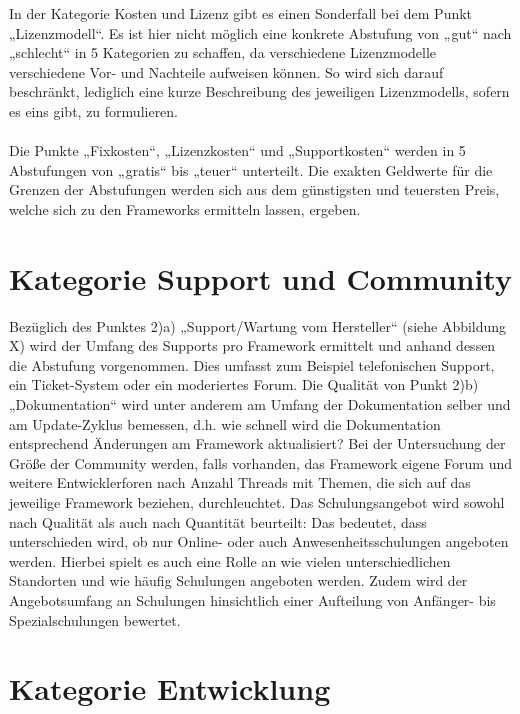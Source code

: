 In der Kategorie Kosten und Lizenz gibt es einen Sonderfall bei dem Punkt „Lizenzmodell“. Es ist hier nicht möglich eine konkrete Abstufung von „gut“ nach „schlecht“ in 5 Kategorien zu schaffen, da verschiedene Lizenzmodelle verschiedene Vor- und Nachteile aufweisen können. So wird sich darauf beschränkt, lediglich eine kurze Beschreibung des jeweiligen Lizenzmodells, sofern es eins gibt, zu formulieren. 
\\
\\
Die Punkte „Fixkosten“, „Lizenzkosten“ und „Supportkosten“ werden in 5 Abstufungen von „gratis“ bis „teuer“ unterteilt. Die exakten Geldwerte für die Grenzen der Abstufungen werden sich aus dem günstigsten und teuersten Preis, welche sich zu den Frameworks ermitteln lassen, ergeben.

\section{Kategorie Support und Community}

Bezüglich des Punktes 2)a) „Support/Wartung vom Hersteller“ (siehe Abbildung X) wird der Umfang des Supports pro Framework ermittelt und anhand dessen die Abstufung vorgenommen. Dies umfasst zum Beispiel telefonischen Support, ein Ticket-System oder ein moderiertes Forum. Die Qualität von Punkt 2)b) „Dokumentation“ wird unter anderem am Umfang der Dokumentation selber und am Update-Zyklus bemessen, d.h. wie schnell wird die Dokumentation entsprechend Änderungen am Framework aktualisiert? Bei der Untersuchung der Größe der Community werden, falls vorhanden, das Framework eigene Forum und weitere Entwicklerforen nach Anzahl Threads mit Themen, die sich auf das jeweilige Framework beziehen, durchleuchtet. Das Schulungsangebot wird sowohl nach Qualität als auch nach Quantität beurteilt: Das bedeutet, dass unterschieden wird, ob nur Online- oder auch Anwesenheitsschulungen angeboten werden. Hierbei spielt es auch eine Rolle an wie vielen unterschiedlichen Standorten und wie häufig Schulungen angeboten werden. Zudem wird der Angebotsumfang an Schulungen hinsichtlich einer Aufteilung von Anfänger- bis Spezialschulungen bewertet.

\section{Kategorie Entwicklung}

